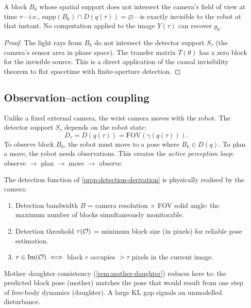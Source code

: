 \begin{theorem}
\label{thm:m-invisible}
A block $B_k$ whose spatial support does not intersect the camera's
field of view at time $\tau$---i.e.,
$\mathrm{supp}(B_k) \cap D(q(\tau)) = \varnothing$---is exactly
invisible to the robot at that instant.  No computation applied to
the image $Y(\tau)$ can recover $g_k$.
\end{theorem}

\begin{proof}
The light rays from $B_k$ do not intersect the detector support
$S_\tau$ (the camera's sensor area in phase space).  The transfer
matrix $T(\theta)$ has a zero block for the invisible source.
This is a direct application of the causal invisibility theorem
to flat spacetime with finite-aperture detection.
\end{proof}

\subsection{Observation--action coupling}

Unlike a fixed external camera, the wrist camera moves with the
robot.  The detector support $S_\tau$ depends on the robot state:
\[
  D_\tau = D(q(\tau)) = \mathrm{FOV}(\gamma(q(\tau))).
\]
To observe block $B_k$, the robot must move to a pose where
$B_k \in D(q)$.  To plan a move, the robot needs observations.
This creates the \emph{active perception loop}: observe $\to$
plan $\to$ move $\to$ observe.

\begin{remark}
\label{rem:m-bandwidth}
The detection function of \cref{prop:detection-derivation}
is physically realised by the camera:
\begin{enumerate}[label=(\roman*),nosep]
  \item Detection bandwidth $B$ = camera resolution $\times$ FOV
  solid angle: the maximum number of blocks simultaneously
  monitorable.
  \item Detection threshold $\tau(\mathcal{O})$ = minimum block size
  (in pixels) for reliable pose estimation.
  \item $r \in \mathrm{Im}(\mathcal{O}) \iff$ block $r$ occupies
  $> \tau$ pixels in the current image.
\end{enumerate}
Mother--daughter consistency (\cref{rem:mother-daughter})
reduces here to: the predicted block pose (mother) matches
the pose that would result from one step of free-body dynamics
(daughter).  A large KL gap signals an unmodelled disturbance.
\end{remark}


